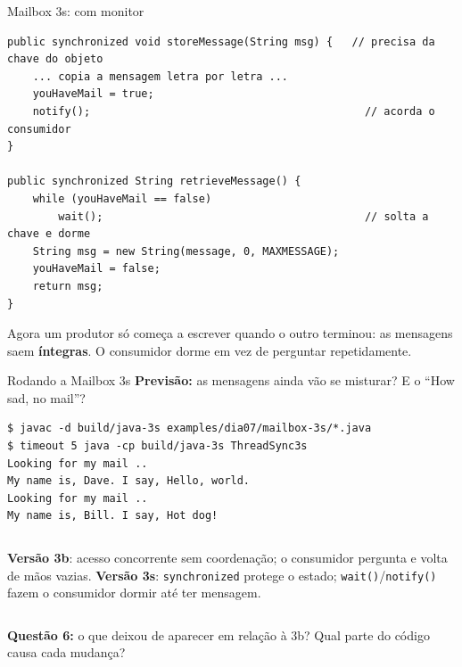 \documentclass[aspectratio=169]{beamer}
\begin{document}
\begin{frame}[fragile]{Mailbox 3s: com monitor}
\begin{lstlisting}[style=java, basicstyle=\ttfamily\scriptsize\color{termfg}]
public synchronized void storeMessage(String msg) {   // precisa da chave do objeto
    ... copia a mensagem letra por letra ...
    youHaveMail = true;
    notify();                                           // acorda o consumidor
}

public synchronized String retrieveMessage() {
    while (youHaveMail == false)
        wait();                                         // solta a chave e dorme
    String msg = new String(message, 0, MAXMESSAGE);
    youHaveMail = false;
    return msg;
}
\end{lstlisting}

\small Agora um produtor só começa a escrever quando o outro terminou: as mensagens saem \textbf{íntegras}. O consumidor dorme em vez de perguntar repetidamente.
\end{frame}

\begin{frame}[fragile]{Rodando a Mailbox 3s}
\textbf{Previsão:} as mensagens ainda vão se misturar? E o ``How sad, no mail''?

\begin{lstlisting}[style=terminal, basicstyle=\ttfamily\scriptsize\color{termfg}]
$ javac -d build/java-3s examples/dia07/mailbox-3s/*.java
$ timeout 5 java -cp build/java-3s ThreadSync3s
Looking for my mail ..
My name is, Dave. I say, Hello, world.
Looking for my mail ..
My name is, Bill. I say, Hot dog!
\end{lstlisting}

\begin{columns}[T]
\small
\textbf{Versão 3b}: acesso concorrente sem coordenação; o consumidor pergunta e volta de mãos vazias.
\small
\textbf{Versão 3s}: \texttt{synchronized} protege o estado; \texttt{wait()}/\texttt{notify()} fazem o consumidor dormir até ter mensagem.
\end{columns}

\vspace{0.6em}
\small \textbf{Questão 6:} o que deixou de aparecer em relação à 3b? Qual parte do código causa cada mudança?
\end{frame}
\end{document}

